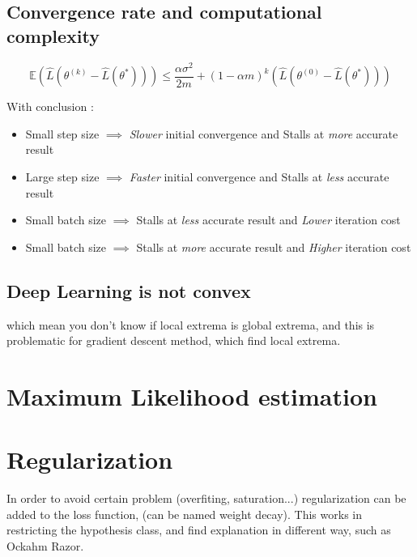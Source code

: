	\subsection{Convergence rate and computational complexity}
		
		\[
			\mathbb{E}(\hat L(\theta^{(k)} - \hat L(\theta^*))) \leq \frac{\alpha \sigma^2}{2m}+ (1 -\alpha m )^k (\hat L(\theta^{(0)} - \hat L(\theta^*)))
		\]

		With conclusion : 
		\begin{itemize}
		 	\item Small step size $\implies$ \emph{Slower} initial convergence and Stalls at \emph{more} accurate result
			\item Large step size $\implies$ \emph{Faster} initial convergence and Stalls at \emph{less} accurate result
			\item Small batch size $\implies$ Stalls at \emph{less} accurate result and \emph{Lower} iteration cost
			\item  Small batch size $\implies$ Stalls at \emph{more} accurate result and \emph{Higher} iteration cost
		\end{itemize}

	\subsection{Deep Learning is not convex}
			which mean you don't know if local extrema is global extrema, and this is problematic for gradient descent method, which find local extrema.



\section{Maximum Likelihood estimation}


\section{Regularization}

	In order to avoid certain problem (overfiting, saturation...) regularization can be added to the loss function, (can be named weight decay). This works in restricting the hypothesis class, and find explanation in different way, such as Ockahm Razor. 

